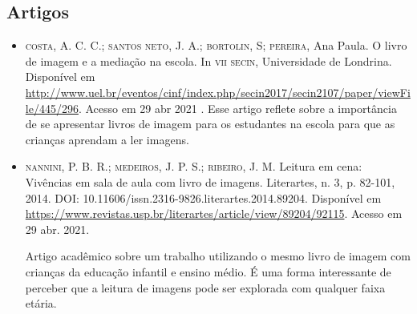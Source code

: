 \documentclass[11pt]{extarticle}
\begin{document}
\subsection{Artigos}

\begin{itemize}
\item \textsc{costa}, A. C. C.; \textsc{santos neto}, J. A.; \textsc{bortolin}, S; \textsc{pereira}, Ana Paula. O livro de imagem e a mediação na escola. 
In \textsc{vii secin}, Universidade de Londrina. Disponível em \url{http://www.uel.br/eventos/cinf/index.php/secin2017/secin2107/paper/viewFile/445/296}. 
Acesso em 29 abr 2021
. 
Esse artigo reflete sobre a importância de se apresentar livros de imagem para os estudantes na escola para que as crianças aprendam a ler imagens. 

\item \textsc{nannini}, P. B. R.; \textsc{medeiros}, J. P. S.; \textsc{ribeiro}, J. M. Leitura em cena: Vivências em sala de aula com livro de imagens. 
Literartes, n. 3, p. 82-101, 2014. DOI: 10.11606/issn.2316-9826.literartes.2014.89204. 
Disponível em \url{https://www.revistas.usp.br/literartes/article/view/89204/92115}. Acesso em 29 abr. 2021. 

Artigo acadêmico sobre um trabalho utilizando o mesmo livro de imagem com crianças da educação infantil e ensino médio. 
É uma forma interessante de perceber que a leitura de imagens pode ser explorada com qualquer faixa etária. 
\end{itemize}
\end{document}
